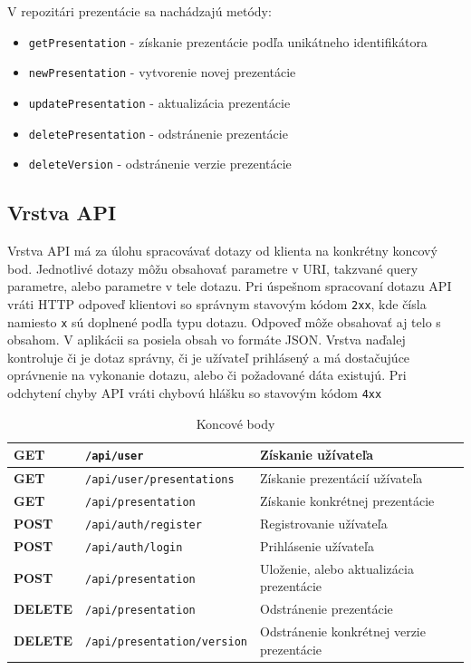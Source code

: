 \vspace{5mm}
V repozitári prezentácie sa nachádzajú metódy: 
    \begin{itemize}
        \item\texttt{getPresentation} - získanie prezentácie podľa unikátneho identifikátora
        \item\texttt{newPresentation} - vytvorenie novej prezentácie
        \item\texttt{updatePresentation} - aktualizácia prezentácie
        \item\texttt{deletePresentation} - odstránenie prezentácie
        \item\texttt{deleteVersion} - odstránenie verzie prezentácie
    \end{itemize}
    
\subsection*{Vrstva API}
Vrstva API má za úlohu spracovávať dotazy od klienta na konkrétny koncový bod. Jednotlivé dotazy môžu obsahovať parametre v URI, takzvané query parametre, alebo parametre v tele dotazu. Pri úspešnom spracovaní dotazu API vráti HTTP odpoveď klientovi so správnym stavovým kódom \texttt{2xx}, kde čísla namiesto \texttt{x} sú doplnené podľa typu dotazu. Odpoveď môže obsahovať aj telo s obsahom. V aplikácii sa posiela obsah vo formáte JSON. Vrstva naďalej kontroluje či je dotaz správny, či je užívateľ prihlásený a má dostačujúce oprávnenie na vykonanie dotazu, alebo či požadované dáta existujú. Pri odchytení chyby API vráti chybovú hlášku so stavovým kódom \texttt{4xx} 

\begin{table}%
    \centering
    \caption{Koncové body}
    \label{table:endpoints}
    \begin{tabular}{ |>{\centering\arraybackslash}m{18mm}|p{50mm}|p{70mm}|}
    \hline
    \textbf{GET} & \texttt{/api/user} & Získanie užívateľa  \\
    \hline
    \textbf{GET} & \texttt{/api/user/presentations} & Získanie prezentácií užívateľa  \\
    \hline
    \textbf{GET} & \texttt{/api/presentation} & Získanie konkrétnej prezentácie  \\
    \hline
    \textbf{POST} & \texttt{/api/auth/register} & Registrovanie užívateľa \\
    \hline
    \textbf{POST} & \texttt{/api/auth/login} & Prihlásenie užívateľa \\
    \hline
    \textbf{POST} & \texttt{/api/presentation} & Uloženie, alebo aktualizácia prezentácie  \\
    \hline
    \textbf{DELETE} & \texttt{/api/presentation} & Odstránenie prezentácie  \\
    \hline
    \textbf{DELETE} & \texttt{/api/presentation/version} & Odstránenie konkrétnej verzie prezentácie \\
    \hline
    \end{tabular}
\end{table}

    
